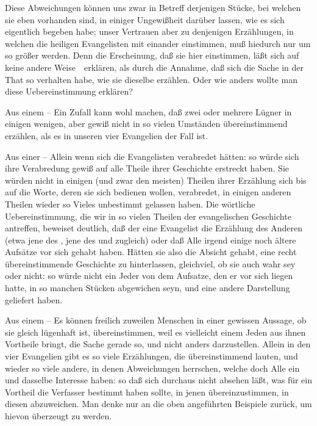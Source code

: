 \begin{aufza}
\begin{aufzb}
\end{aufzb}
\item Diese Abweichungen können uns zwar in Betreff derjenigen Stücke, bei welchen sie eben vorhanden sind, in einiger Ungewißheit darüber lassen, wie es sich eigentlich begeben habe; unser Vertrauen aber zu denjenigen Erzählungen, in welchen die heiligen Evangelisten mit einander einstimmen, muß hiedurch nur um so größer werden. Denn die Erscheinung, daß sie hier einstimmen, läßt sich auf keine andere Weise~\ erklären, als durch die Annahme, daß sich die Sache in der That so verhalten habe, wie sie dieselbe erzählen. Oder wie anders wollte man diese Uebereinstimmung erklären?
\begin{aufzb}
\item Aus einem  -- Ein Zufall kann wohl machen, daß zwei oder mehrere Lügner in einigen wenigen, aber gewiß nicht in so vielen Umständen übereinstimmend erzählen, als es in unseren vier Evangelien der Fall ist.
\item Aus einer  -- Allein wenn sich die Evangelisten verabredet hätten: so würde sich ihre Verabredung gewiß auf alle Theile ihrer Geschichte erstreckt haben. Sie würden nicht in einigen (und zwar den meisten) Theilen ihrer Erzählung sich bis auf die Worte, deren sie sich bedienen wollen, verabredet, in einigen anderen Theilen wieder so Vieles unbestimmt gelassen haben. Die wörtliche Uebereinstimmung, die wir in so vielen Theilen der evangelischen Geschichte antreffen, beweiset deutlich, daß der eine Evangelist die Erzählung des Anderen (etwa  jene des ,  jene des  und  zugleich) oder daß Alle irgend einige noch ältere Aufsätze vor sich gehabt haben. Hätten sie also die Absicht gehabt, eine recht übereinstimmende Geschichte zu hinterlassen, gleichviel, ob sie auch wahr sey oder nicht: so würde nicht ein Jeder von dem Aufsatze, den er vor sich liegen hatte, in so manchen Stücken abgewichen seyn, und eine andere Darstellung geliefert haben.
\item Aus einem  -- Es können freilich zuweilen Menschen in einer gewissen Aussage, ob sie gleich lügenhaft ist, übereinstimmen, weil es vielleicht einem Jeden aus ihnen Vortheile bringt, die Sache gerade so, und nicht anders darzustellen. Allein in den vier Evangelien gibt es so viele Erzählungen, die übereinstimmend lauten, und wieder so viele andere, in denen Abweichungen herrschen, welche doch Alle ein und dasselbe Interesse haben: so daß sich durchaus nicht absehen läßt, was für ein Vortheil die Verfasser bestimmt haben sollte, in jenen übereinzustimmen, in diesen abzuweichen. Man denke nur an die oben angeführten Beispiele zurück, um hievon überzeugt zu werden.~

\end{aufzb}
\end{aufza}
